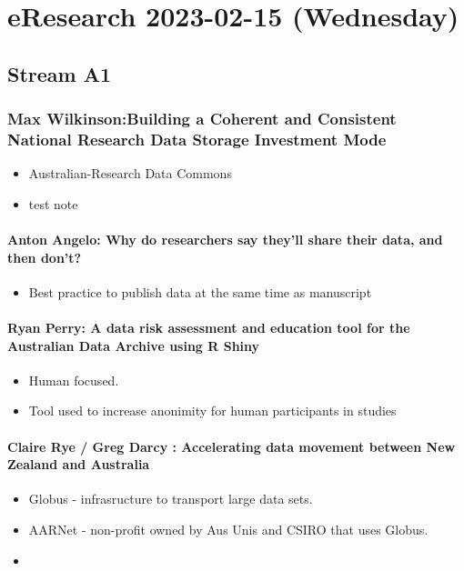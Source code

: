 \documentclass[document.tex]{subfiles}
\begin{document}
\chapter{eResearch 2023-02-15 (Wednesday)}

\label{day:2023-02-15}
\section*{Stream A1}

\subsection{Max Wilkinson:Building a Coherent and Consistent National Research Data Storage Investment Mode}
\begin{itemize}
    \item Australian-Research Data Commons 
    \item test note
    \end{itemize}

\subsubsection{Anton Angelo: Why do researchers say they’ll share their data, and then don’t?}
\begin{itemize}
    \item Best practice to publish data at the same time as manuscript
    \end{itemize}

\subsubsection{Ryan Perry: A data risk assessment and education tool for the Australian Data Archive using R Shiny}
\begin{itemize}
    \item Human focused.
    \item Tool used to increase anonimity for human participants in studies
    \end{itemize}

\subsubsection{Claire Rye / Greg Darcy : Accelerating data movement between New Zealand and Australia}
\begin{itemize}
    \item Globus - infrasructure to transport large data sets. 
    \item AARNet - non-profit owned by Aus Unis and CSIRO that uses Globus.
    \item  
    \end{itemize}
\end{document}

